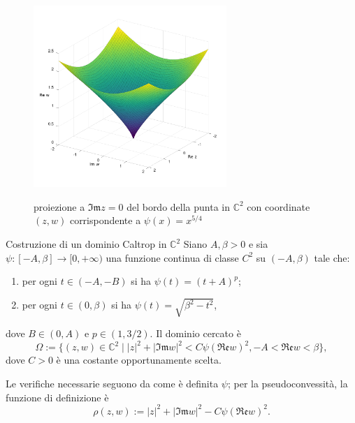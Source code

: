 \begin{frame}
{\begin{figure}
      \begin{center}
          \includegraphics[width=0.65\textwidth, trim=0 4cm 0 1.7cm]{caltrop.png} \\
          \caption{proiezione a $\mathfrak{Im}z=0$ del bordo della punta in $\mathbb{C}^2$ con coordinate $(z,w)$ corrispondente a $\psi(x)=x^{5/4}$}
      \end{center}
  \end{figure}
  }
\end{frame}

\begin{frame}{Costruzione di un dominio Caltrop in $\mathbb{C}^2$}
  Siano $A,\beta>0$ e sia $\psi:[-A,\beta]\longrightarrow[0,+\infty)$ una funzione continua di classe $C^2$ su $(-A,\beta)$ tale che:\pause
  \begin{enumerate}
    \item per ogni $t\in(-A,-B)$ si ha $\psi(t)=(t+A)^p$;\pause
    \item per ogni $t\in(0,\beta)$ si ha $\psi(t)=\sqrt{\beta^2-t^2}$,
  \end{enumerate}
  dove $B\in(0,A)$ e $p\in(1,3/2)$. \pause Il dominio cercato è
  $$\Omega:=\{(z,w)\in\mathbb{C}^2\mid |z|^2+|\mathfrak{Im}w|^2<C\psi(\mathfrak{Re}w)^2,-A<\mathfrak{Re}w<\beta\},$$
  dove $C>0$ è una costante opportunamente scelta.\pause
  
  Le verifiche necessarie seguono da come è definita $\psi$; \pause per la pseudoconvessità, la funzione di definizione è
  $$\rho(z,w):=|z|^2+|\mathfrak{Im}w|^2-C\psi(\mathfrak{Re}w)^2.$$
\end{frame}

